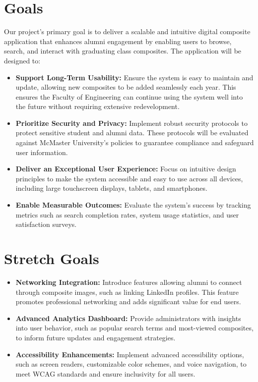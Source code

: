 \documentclass{article}
\begin{document}
\section{Goals}

 Our project’s primary goal is to deliver a scalable and intuitive digital composite application that enhances alumni engagement by enabling users to browse, search, and interact with graduating class composites. The application will be designed to:
\begin{itemize}
    \item \textbf{Support Long-Term Usability:}
    Ensure the system is easy to maintain and update, allowing new composites to be added seamlessly each year. This ensures the Faculty of Engineering can continue using the system well into the future without requiring extensive redevelopment.
    \item \textbf{Prioritize Security and Privacy:}
    Implement robust security protocols to protect sensitive student and alumni data. These protocols will be evaluated against McMaster University's policies to guarantee compliance and safeguard user information.
    \item \textbf{Deliver an Exceptional User Experience:}
    Focus on intuitive design principles to make the system accessible and easy to use across all devices, including large touchscreen displays, tablets, and smartphones.
    \item \textbf{Enable Measurable Outcomes:}
    Evaluate the system's success by tracking metrics such as search completion rates, system usage statistics, and user satisfaction surveys.
\end{itemize}
 

\section{Stretch Goals}
\begin{itemize}
    \item \textbf{Networking Integration:}  
    Introduce features allowing alumni to connect through composite images, such as linking LinkedIn profiles. This feature promotes professional networking and adds significant value for end users.

    \item \textbf{Advanced Analytics Dashboard:}  
    Provide administrators with insights into user behavior, such as popular search terms and most-viewed composites, to inform future updates and engagement strategies.

    \item \textbf{Accessibility Enhancements:}  
    Implement advanced accessibility options, such as screen readers, customizable color schemes, and voice navigation, to meet WCAG standards and ensure inclusivity for all users.
\end{itemize}
\end{document}
